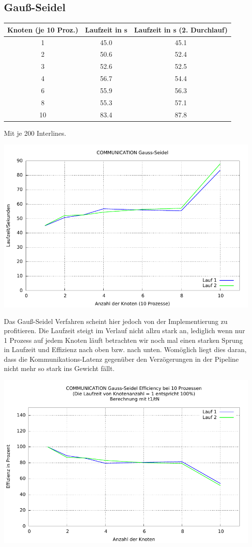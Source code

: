 \documentclass[a4paper]{article}
\begin{document}
\subsection{Gauß-Seidel}
\begin{tabular}{|c|c|c|}
\hline 
Knoten (je 10 Proz.) & Laufzeit in s & Laufzeit in s (2. Durchlauf) \\ 
\hline 
1 & 45.0 & 45.1 \\ 
\hline 
2 & 50.6 & 52.4 \\ 
\hline 
3 & 52.6 & 52.5 \\ 
\hline 
4 & 56.7 & 54.4 \\ 
\hline 
6 & 55.9 & 56.3 \\ 
\hline 
8 & 55.3 & 57.1 \\ 
\hline 
10 & 83.4 & 87.8 \\ 
\hline 
\end{tabular} 

Mit je 200 Interlines.

\includegraphics[scale=0.8]{img/COMMUNICATION_GS_laufzeit.pdf}

Das Gauß-Seidel Verfahren scheint hier jedoch von der Implementierung zu profitieren. Die Laufzeit steigt im Verlauf nicht allzu stark an, lediglich wenn nur 1 Prozess auf jedem Knoten läuft betrachten wir noch mal einen starken Sprung in Laufzeit und Effizienz nach oben bzw. nach unten. Womöglich liegt dies daran, dass die Kommunikations-Latenz gegenüber den Verzögerungen in der Pipeline nicht mehr so stark ins Gewicht fällt.

\includegraphics[scale=0.8]{img/COMMUNICATION_GS_efficiency.pdf}
\end{document}

